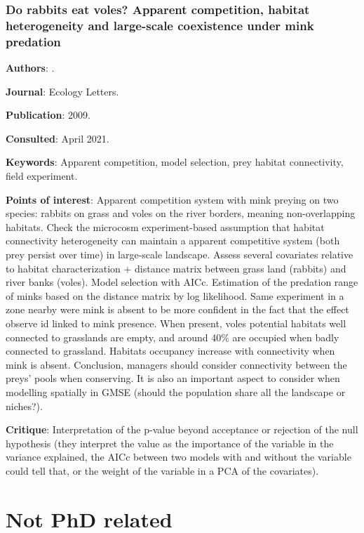 \documentclass[12pt,a4paper]{article}
\begin{document}
\newpage

\subsubsection*{Do rabbits eat voles? Apparent competition, habitat heterogeneity and large-scale coexistence under mink predation}

\textbf{Authors}: \cite{oliver2009rabbits}.

\textbf{Journal}: Ecology Letters.

\textbf{Publication}: 2009.

\textbf{Consulted}: April 2021.

\textbf{Keywords}: Apparent competition, model selection, prey habitat connectivity, field experiment.

\textbf{Points of interest}: Apparent competition system with mink preying on two species: rabbits on grass and voles on the river borders, meaning non-overlapping habitats. Check the microcosm experiment-based assumption that habitat connectivity heterogeneity can maintain a apparent competitive system (both prey persist over time) in large-scale landscape. Assess several covariates relative to habitat characterization + distance matrix between grass land (rabbits) and river banks (voles). Model selection with AICc. Estimation of the predation range of minks based on the distance matrix by log likelihood. Same experiment in a zone nearby were mink is absent to be more confident in the fact that the effect observe id linked to mink presence. When present, voles potential habitats well connected to grasslands are empty, and around 40\% are occupied when badly connected to grassland. Habitats occupancy increase with connectivity when mink is absent. Conclusion, managers should consider connectivity between the preys' pools when conserving. It is also an important aspect to consider when modelling spatially in GMSE (should the population share all the landscape or niches?).

\textbf{Critique}: Interpretation of the p-value beyond acceptance or rejection of the null hypothesis (they interpret the value as the importance of the variable in the variance explained, the AICc between two models with and without the variable could tell that, or the weight of the variable in a PCA of the covariates).

\newpage

\section*{Not PhD related}
\end{document}
